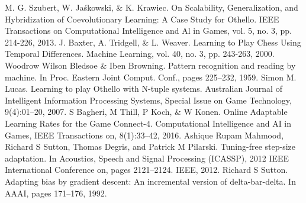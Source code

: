 \documentclass{suribt}
\begin{document}
\begin{thebibliography}{}
  M. G. Szubert, W. Ja\'{s}kowski, \& K. Krawiec. On Scalability, Generalization, and Hybridization of Coevolutionary Learning: A Case Study for Othello. IEEE Transactions on Computational Intelligence and Al in Games, vol. 5, no. 3, pp. 214-226, 2013.
  J. Baxter, A. Tridgell, \& L. Weaver. Learning to Play Chess Using Temporal Differences. Machine Learning, vol. 40, no. 3, pp. 243-263, 2000.
  Woodrow Wilson Bledsoe \& Iben Browning. Pattern recognition and reading by machine. In Proc. Eastern Joint Comput. Conf., pages 225–232, 1959.
  Simon M. Lucas. Learning to play Othello with N-tuple systems. Australian Journal of Intelligent Information Processing Systems, Special Issue on Game Technology, 9(4):01–20, 2007.
  S Bagheri, M Thill, P Koch, \& W Konen. Online Adaptable Learning Rates for the Game Connect-4. Computational Intelligence and AI in Games, IEEE Transactions on, 8(1):33–42, 2016.
  Ashique Rupam Mahmood, Richard S Sutton, Thomas Degris, and Patrick M Pilarski. Tuning-free step-size adaptation. In Acoustics, Speech and Signal Processing (ICASSP), 2012 IEEE International Conference on, pages 2121–2124. IEEE, 2012.
  Richard S Sutton. Adapting bias by gradient descent: An incremental version of delta-bar-delta. In AAAI, pages 171–176, 1992.
\end{thebibliography}
\end{document}
